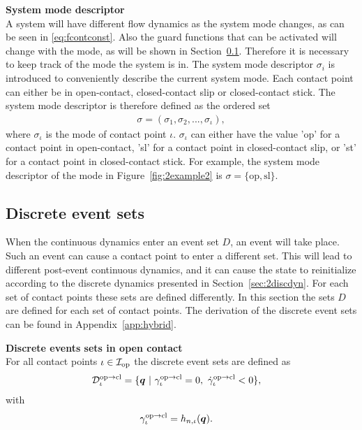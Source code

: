 \documentclass[../DC2017114Bouma.tex]{subfiles}
\begin{document}
\textbf{System mode descriptor}\\
A system will have different flow dynamics as the system mode changes, as can be seen in \eqref{eq:fcontconst}. Also the guard functions that can be activated will change with the mode, as will be shown in Section~\ref{sec:2event}. Therefore it is necessary to keep track of the mode the system is in. The system mode descriptor $\sigma_i$ is introduced to conveniently describe the current system mode. Each contact point can either be in open-contact, closed-contact slip or closed-contact stick. The system mode descriptor is therefore defined as the ordered set
\begin{align}
\sigma = (\sigma_1,\sigma_2,...,\sigma_\iota),
\end{align}
where $\sigma_\iota$ is the mode of contact point $\iota$. $\sigma_\iota$ can either have the value 'op' for a contact point in open-contact, 'sl' for a contact point in closed-contact slip, or 'st' for a contact point in closed-contact stick. For example, the system mode descriptor of the mode in Figure~\ref{fig:2example2} is $\sigma = \{\text{op},\text{sl}\}$.

\subsection{Discrete event sets}\label{sec:2event}
When the continuous dynamics enter an event set $D$, an event will take place. Such an event can cause a contact point to enter a different set. This will lead to different post-event continuous dynamics, and it can cause the state to reinitialize according to the discrete dynamics presented in Section~\ref{sec:2discdyn}. For each set of contact points these sets are defined differently. In this section the sets $D$ are defined for each set of contact points. The derivation of the discrete event sets can be found in Appendix~\ref{app:hybrid}.

\textbf{Discrete events sets in open contact}\\
For all contact points $\iota\in\mathcal{I}_{\text{op}}$ the discrete event sets are defined as
\begin{align}
\mathcal{D}^{\text{op}\rightarrow\text{cl}}_{\iota} &= \{ \qb\ |\ \gamma^{\text{op}\rightarrow\text{cl}}_{\iota} = 0,\ \dot{\gamma}^{\text{op}\rightarrow\text{cl}}_{\iota} < 0 \},\label{eq:2Dopcl}
\end{align}
%
with
\begin{align}
\gamma^{\text{op}\rightarrow\text{cl}}_{\iota} &= h_{n,\iota}({\boldsymbol{q}}).
\end{align}
\end{document}
